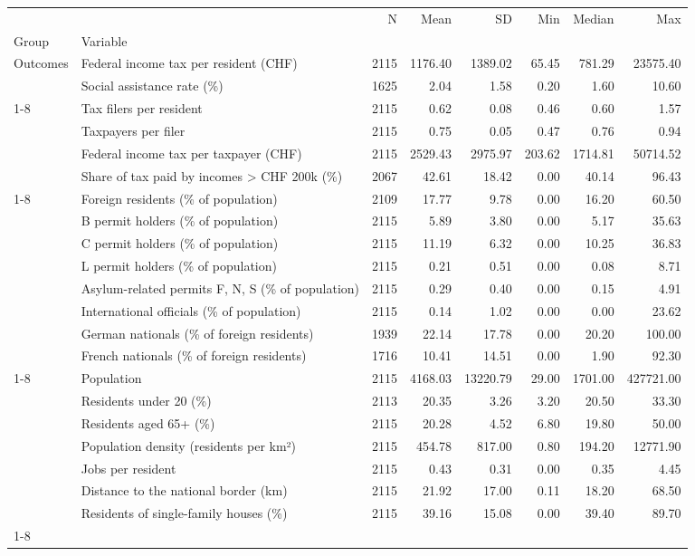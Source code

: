 \begin{tabular}{llrrrrrr}
\toprule
 &  & N & Mean & SD & Min & Median & Max \\
Group & Variable &  &  &  &  &  &  \\
\midrule
\multirow[t]{2}{*}{Outcomes} & Federal income tax per resident (CHF) & 2115 & 1176.40 & 1389.02 & 65.45 & 781.29 & 23575.40 \\
 & Social assistance rate (\%) & 1625 & 2.04 & 1.58 & 0.20 & 1.60 & 10.60 \\
\cline{1-8}
\multirow[t]{4}{*}{Tax split (mechanisms)} & Tax filers per resident & 2115 & 0.62 & 0.08 & 0.46 & 0.60 & 1.57 \\
 & Taxpayers per filer & 2115 & 0.75 & 0.05 & 0.47 & 0.76 & 0.94 \\
 & Federal income tax per taxpayer (CHF) & 2115 & 2529.43 & 2975.97 & 203.62 & 1714.81 & 50714.52 \\
 & Share of tax paid by incomes > CHF 200k (\%) & 2067 & 42.61 & 18.42 & 0.00 & 40.14 & 96.43 \\
\cline{1-8}
\multirow[t]{8}{*}{Foreign residents} & Foreign residents (\% of population) & 2109 & 17.77 & 9.78 & 0.00 & 16.20 & 60.50 \\
 & B permit holders (\% of population) & 2115 & 5.89 & 3.80 & 0.00 & 5.17 & 35.63 \\
 & C permit holders (\% of population) & 2115 & 11.19 & 6.32 & 0.00 & 10.25 & 36.83 \\
 & L permit holders (\% of population) & 2115 & 0.21 & 0.51 & 0.00 & 0.08 & 8.71 \\
 & Asylum-related permits F, N, S (\% of population) & 2115 & 0.29 & 0.40 & 0.00 & 0.15 & 4.91 \\
 & International officials (\% of population) & 2115 & 0.14 & 1.02 & 0.00 & 0.00 & 23.62 \\
 & German nationals (\% of foreign residents) & 1939 & 22.14 & 17.78 & 0.00 & 20.20 & 100.00 \\
 & French nationals (\% of foreign residents) & 1716 & 10.41 & 14.51 & 0.00 & 1.90 & 92.30 \\
\cline{1-8}
\multirow[t]{7}{*}{Controls} & Population & 2115 & 4168.03 & 13220.79 & 29.00 & 1701.00 & 427721.00 \\
 & Residents under 20 (\%) & 2113 & 20.35 & 3.26 & 3.20 & 20.50 & 33.30 \\
 & Residents aged 65+ (\%) & 2115 & 20.28 & 4.52 & 6.80 & 19.80 & 50.00 \\
 & Population density (residents per km²) & 2115 & 454.78 & 817.00 & 0.80 & 194.20 & 12771.90 \\
 & Jobs per resident & 2115 & 0.43 & 0.31 & 0.00 & 0.35 & 4.45 \\
 & Distance to the national border (km) & 2115 & 21.92 & 17.00 & 0.11 & 18.20 & 68.50 \\
 & Residents of single-family houses (\%) & 2115 & 39.16 & 15.08 & 0.00 & 39.40 & 89.70 \\
\cline{1-8}
\bottomrule
\end{tabular}
